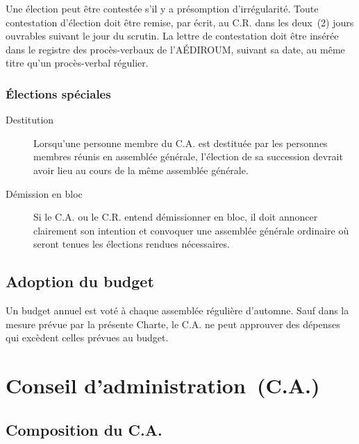 \documentclass{aediroum}
\begin{document}
Une élection peut être contestée s'il y a présomption d'irrégularité. Toute contestation d'élection doit être remise, par écrit, au C.R. dans les deux~(2) jours ouvrables suivant le jour du scrutin. La lettre de contestation doit être insérée dans le registre des procès-verbaux de l'AÉDIROUM, suivant sa date, au même titre qu'un procès-verbal régulier.

\subsubsection{Élections spéciales}\label{sec:elections-speciales}

\begin{description}
\item[Destitution] Lorsqu'une personne membre du C.A. est destituée par les personnes membres réunis en assemblée générale, l'élection de sa succession devrait avoir lieu au cours de la même assemblée générale.
\item[Démission en bloc] Si le C.A. ou le C.R. entend démissionner en bloc, il doit annoncer clairement son intention et convoquer une assemblée générale ordinaire où seront tenues les élections rendues nécessaires.
\end{description}

\subsection{Adoption du budget}\label{sec:adoption-budget}

Un budget annuel est voté à chaque assemblée régulière d'automne. Sauf dans la mesure prévue par la présente Charte, le C.A. ne peut approuver des dépenses qui excèdent celles prévues au budget.

\section{Conseil d’administration~(C.A.)}\label{sec:conseil-executif-et-conseil-dadministration}
\subsection{Composition du C.A.}\label{sec:composition-du-conseil-executif}
\end{document}
